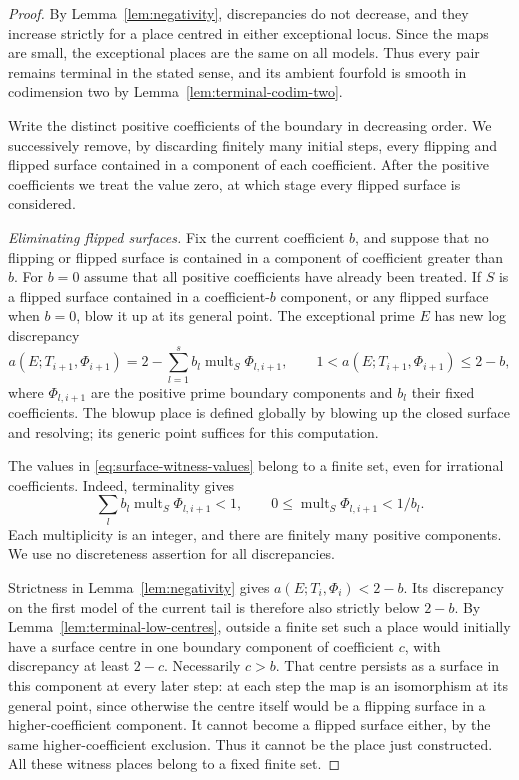 \begin{proof}
By Lemma~\ref{lem:negativity}, discrepancies do not decrease, and they
increase strictly for a place centred in either exceptional locus.
Since the maps are small, the exceptional places are the same on all
models.  Thus every pair remains terminal in the stated sense, and its
ambient fourfold is smooth in codimension two by
Lemma~\ref{lem:terminal-codim-two}.

Write the distinct positive coefficients of the boundary in decreasing
order.  We successively remove, by discarding finitely many initial
steps, every flipping and flipped surface contained in a component of
each coefficient.  After the positive coefficients we treat the value
zero, at which stage every flipped surface is considered.

\smallskip\noindent
\emph{Eliminating flipped surfaces.}
Fix the current coefficient $b$, and suppose that no flipping or flipped
surface is contained in a component of coefficient greater than $b$.
For $b=0$ assume that all positive coefficients have already been treated.
If $S$ is a flipped surface contained in a coefficient-$b$ component,
or any flipped surface when $b=0$, blow it up at its general point.
The exceptional prime $E$ has new log discrepancy
\begin{equation}\label{eq:surface-witness-values}
 a(E;T_{i+1},\Phi_{i+1})
   =2-\sum_{l=1}^{s}b_l\operatorname{mult}_{S}\Phi_{l,i+1},
 \qquad 1<a(E;T_{i+1},\Phi_{i+1})\leq2-b,
\end{equation}
where $\Phi_{l,i+1}$ are the positive prime boundary components and
$b_l$ their fixed coefficients.  The blowup place is defined globally
by blowing up the closed surface and resolving; its generic point
suffices for this computation.

The values in \eqref{eq:surface-witness-values} belong to a finite set,
even for irrational coefficients.  Indeed, terminality gives
\[
 \sum_l b_l\operatorname{mult}_{S}\Phi_{l,i+1}<1,
 \qquad
 0\leq\operatorname{mult}_{S}\Phi_{l,i+1}<1/b_l.
\]
Each multiplicity is an integer, and there are finitely many positive
components.  We use no discreteness assertion for all discrepancies.

Strictness in Lemma~\ref{lem:negativity} gives
$a(E;T_i,\Phi_i)<2-b$.  Its discrepancy on the first model of the
current tail is therefore also strictly below $2-b$.  By
Lemma~\ref{lem:terminal-low-centres}, outside a finite set such a place
would initially have a surface centre in one boundary component of
coefficient $c$, with discrepancy at least $2-c$.  Necessarily $c>b$.
That centre persists as a surface in this component at every later
step: at each step the map is an isomorphism at its general point,
since otherwise the centre itself would be a flipping surface in a
higher-coefficient component.  It cannot become a flipped surface
either, by the same higher-coefficient exclusion.  Thus it cannot be
the place just constructed.  All these witness places belong to a
fixed finite set.


\end{proof}
